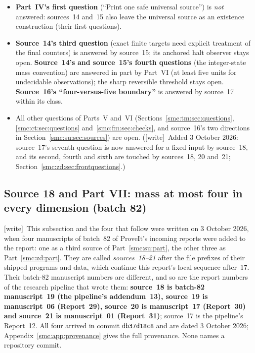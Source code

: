 \documentclass[11pt,letterpaper]{article}
\numberwithin{equation}{section}
\theoremstyle{definition}
\theoremstyle{remark}
\newcommand{\wtag}{\textup{[write]}}
\begin{document}
\begin{itemize}
\item \textbf{Part~IV's first question} (``Print one safe universal source'') is \emph{not} answered: sources~14 and~15 also leave the universal source as an existence construction (their first questions).
\item \textbf{Source~14's third question} (exact finite targets need explicit treatment of the final counters) is answered by source~15; its anchored halt observer stays open. \textbf{Source~14's and source~15's fourth questions} (the integer-state mass convention) are answered in part by Part~VI (at least five units for undecidable observations); the sharp reversible threshold stays open. \textbf{Source~16's ``four-versus-five boundary''} is answered by source~17 within its class.
\item All other questions of Parts~V and~VI (Sections~\ref{smc:tm:sec:questions}, \ref{smc:ct:sec:questions} and~\ref{smc:fm:sec:checks}, and source~16's two directions in Section~\ref{smc:su:sec:sources}) are open. (\wtag\ Added 3 October 2026: source~17's seventh question is now answered for a fixed input by source~18, and its second, fourth and sixth are touched by sources~18, 20 and~21; Section~\ref{smc:zd:sec:frontquestions}.)
\end{itemize}

\subsection{Source 18 and Part VII: mass at most four in every dimension (batch 82)}\label{smc:zd:sec:batch82}

\wtag\ This subsection and the four that follow were written on 3 October 2026, when four manuscripts of batch~82 of ProveIt's incoming reports were added to the report: one as a third source of Part~\ref{smc:su:part}, the other three as Part~\ref{smc:zd:part}. They are called \emph{sources~18--21} after the file prefixes of their shipped programs and data, which continue this report's local sequence after~17. Their batch-82 manuscript numbers are different, and so are the report numbers of the research pipeline that wrote them: \textbf{source~18 is batch-82 manuscript~19 (the pipeline's addendum~13), source~19 is manuscript~06 (Report~29), source~20 is manuscript~17 (Report~30) and source~21 is manuscript~01 (Report~31)}; source~17 is the pipeline's Report~12. All four arrived in commit \texttt{db37d18c8} and are dated 3 October 2026; Appendix~\ref{smc:app:provenance} gives the full provenance. None names a repository commit.
\end{document}
